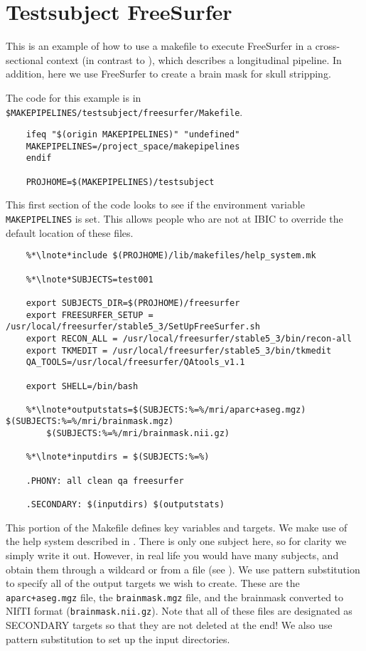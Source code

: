 \section{Testsubject FreeSurfer}
\label{example:freesurfer}

This is an example of how to use a makefile to execute FreeSurfer in a cross-sectional context (in contrast to
), which describes a longitudinal pipeline.  In addition, here we use FreeSurfer to
create a brain mask for skull stripping.

The code for this example is in \texttt{\$MAKEPIPELINES/testsubject/freesurfer/Makefile}.

\setcounter{codehighlight}{0} %

\begin{lstlisting}
	ifeq "$(origin MAKEPIPELINES)" "undefined"
	MAKEPIPELINES=/project_space/makepipelines
	endif

	PROJHOME=$(MAKEPIPELINES)/testsubject 
\end{lstlisting}

This first section of the code looks to see if the environment variable
\texttt{MAKEPIPELINES} is set. This allows people who are not at IBIC
to override the default location of these files.

\begin{lstlisting}
	%*\lnote*include $(PROJHOME)/lib/makefiles/help_system.mk 

	%*\lnote*SUBJECTS=test001 

	export SUBJECTS_DIR=$(PROJHOME)/freesurfer 
	export FREESURFER_SETUP = /usr/local/freesurfer/stable5_3/SetUpFreeSurfer.sh 
	export RECON_ALL = /usr/local/freesurfer/stable5_3/bin/recon-all 
	export TKMEDIT = /usr/local/freesurfer/stable5_3/bin/tkmedit 
	QA_TOOLS=/usr/local/freesurfer/QAtools_v1.1 

	export SHELL=/bin/bash

	%*\lnote*outputstats=$(SUBJECTS:%=%/mri/aparc+aseg.mgz) $(SUBJECTS:%=%/mri/brainmask.mgz)
		$(SUBJECTS:%=%/mri/brainmask.nii.gz)

	%*\lnote*inputdirs = $(SUBJECTS:%=%)

	.PHONY: all clean qa freesurfer

	.SECONDARY: $(inputdirs) $(outputstats)
\end{lstlisting}

This portion of the Makefile defines key variables and targets. 
 We make use of the help system described in
. 
 There is only one subject here, so for clarity we simply
write it out. However, in real life you would have many subjects, and
obtain them through a wildcard or from a file (see
).
 We use pattern substitution to specify all of the output
targets we wish to create. These are the \texttt{aparc+aseg.mgz} file,
the \texttt{brainmask.mgz} file, and the brainmask converted to NIfTI
format (\texttt{brainmask.nii.gz}). Note that all of these files are
designated as SECONDARY targets so that they are not deleted at the end!
 We also use pattern substitution to set up the input directories.


